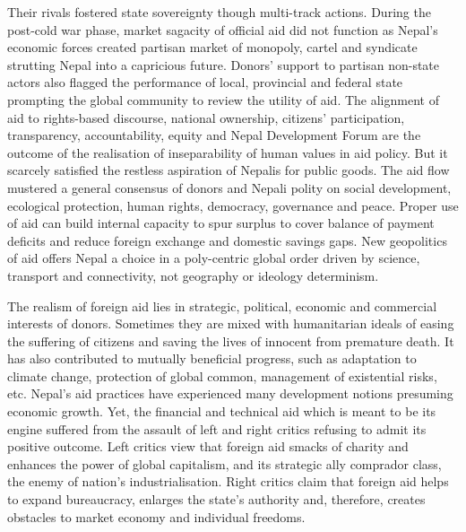\documentclass[
  openany]{book}
\begin{document}
Their rivals fostered state sovereignty though multi-track actions. During the post-cold war phase, market sagacity of official aid did not function as Nepal's economic forces created partisan market of monopoly, cartel and syndicate strutting Nepal into a capricious future. Donors' support to partisan non-state actors also flagged the performance of local, provincial and federal state prompting the global community to review the utility of aid. The alignment of aid to rights-based discourse, national ownership, citizens' participation, transparency, accountability, equity and Nepal Development Forum are the outcome of the realisation of inseparability of human values in aid policy. But it scarcely satisfied the restless aspiration of Nepalis for public goods. The aid flow mustered a general consensus of donors and Nepali polity on social development, ecological protection, human rights, democracy, governance and peace. Proper use of aid can build internal capacity to spur surplus to cover balance of payment deficits and reduce foreign exchange and domestic savings gaps. New geopolitics of aid offers Nepal a choice in a poly-centric global order driven by science, transport and connectivity, not geography or ideology determinism.

The realism of foreign aid lies in strategic, political, economic and commercial interests of donors. Sometimes they are mixed with humanitarian ideals of easing the suffering of citizens and saving the lives of innocent from premature death. It has also contributed to mutually beneficial progress, such as adaptation to climate change, protection of global common, management of existential risks, etc. Nepal's aid practices have experienced many development notions presuming economic growth. Yet, the financial and technical aid which is meant to be its engine suffered from the assault of left and right critics refusing to admit its positive outcome. Left critics view that foreign aid smacks of charity and enhances the power of global capitalism, and its strategic ally comprador class, the enemy of nation's industrialisation. Right critics claim that foreign aid helps to expand bureaucracy, enlarges the state's authority and, therefore, creates obstacles to market economy and individual freedoms.
\end{document}
